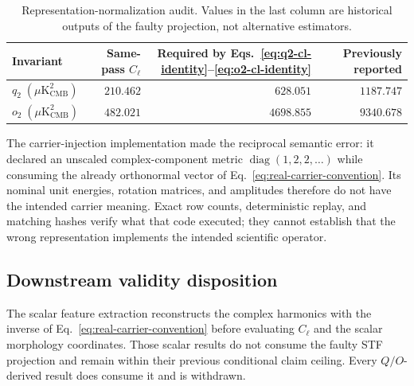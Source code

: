 \documentclass[11pt,a4paper]{article}
\newcommand{\microK}{\mu\mathrm{K}_{\mathrm{CMB}}}
\begin{document}
\begin{table}[H]
\centering
\small
\caption{Representation-normalization audit.  Values in the last column are
historical outputs of the faulty projection, not alternative estimators.}
\label{tab:normalization-audit}
\begin{tabular}{@{}lrrr@{}}
\toprule
Invariant & Same-pass $C_\ell$ & Required by
Eqs.~\eqref{eq:q2-cl-identity}--\eqref{eq:o2-cl-identity}
& Previously reported\\
\midrule
$q_2\;(\microK^2)$ & $210.462$ & $628.051$ & $1187.747$\\
$o_2\;(\microK^2)$ & $482.021$ & $4698.855$ & $9340.678$\\
\bottomrule
\end{tabular}
\end{table}

The carrier-injection implementation made the reciprocal semantic error: it
declared an unscaled complex-component metric
$\operatorname{diag}(1,2,2,\ldots)$ while consuming the already orthonormal
vector of Eq.~\eqref{eq:real-carrier-convention}.  Its nominal unit energies,
rotation matrices, and amplitudes therefore do not have the intended carrier
meaning.  Exact row counts, deterministic replay, and matching hashes verify
what that code executed; they cannot establish that the wrong representation
implements the intended scientific operator.

\subsection{Downstream validity disposition}

The scalar feature extraction reconstructs the complex harmonics with the
inverse of Eq.~\eqref{eq:real-carrier-convention} before evaluating $C_\ell$
and the scalar morphology coordinates.  Those scalar results do not consume
the faulty STF projection and remain within their previous conditional claim
ceiling.  Every $Q/O$-derived result does consume it and is withdrawn.
\end{document}
